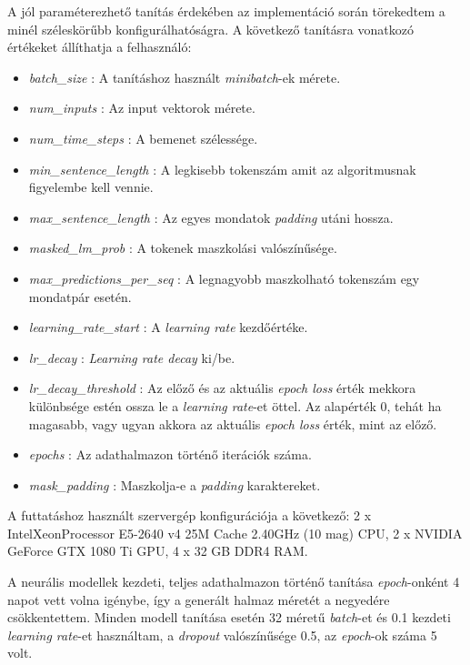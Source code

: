 A jól paraméterezhető tanítás érdekében az implementáció során törekedtem a minél széleskörűbb konfigurálhatóságra. A következő tanításra vonatkozó értékeket állíthatja a felhasználó:
\begin{itemize}
	\item \textit{batch\_size} : A tanításhoz használt \textit{minibatch}-ek mérete.
	\item \textit{num\_inputs} : Az input vektorok mérete.
	\item \textit{num\_time\_steps} : A bemenet szélessége.
	\item \textit{min\_sentence\_length} : A legkisebb tokenszám amit az algoritmusnak figyelembe kell vennie.
	\item \textit{max\_sentence\_length} : Az egyes mondatok \textit{padding} utáni hossza.
	\item \textit{masked\_lm\_prob} : A tokenek maszkolási valószínűsége.
	\item \textit{max\_predictions\_per\_seq} : A legnagyobb maszkolható tokenszám egy mondatpár esetén.
	
	\item \textit{learning\_rate\_start} : A \textit{learning rate} kezdőértéke.
	\item \textit{lr\_decay} : \textit{Learning rate decay} ki/be.
	\item \textit{lr\_decay\_threshold} : Az előző és az aktuális \textit{epoch loss} érték mekkora különbsége estén ossza le a \textit{learning rate}-et öttel. Az alapérték 0, tehát ha magasabb, vagy ugyan akkora az aktuális \textit{epoch loss} érték, mint az előző.
	\item \textit{epochs} : Az adathalmazon történő iterációk száma.
	\item \textit{mask\_padding} : Maszkolja-e a \textit{padding} karaktereket.
\end{itemize}

A futtatáshoz használt szervergép konfigurációja a következő: 2 x Intel\textregistered Xeon\textregistered  Processor E5-2640 v4 25M Cache 2.40GHz (10 mag) CPU, 2 x NVIDIA GeForce GTX 1080 Ti GPU, 4 x 32 GB DDR4 RAM.

A neurális modellek kezdeti, teljes adathalmazon történő tanítása \textit{epoch}-onként 4 napot vett volna igénybe, így a generált halmaz méretét a negyedére csökkentettem. Minden modell tanítása esetén 32 méretű \textit{batch}-et és 0.1 kezdeti \textit{learning rate}-et használtam, a \textit{dropout} valószínűsége 0.5, az \textit{epoch}-ok száma 5 volt.

